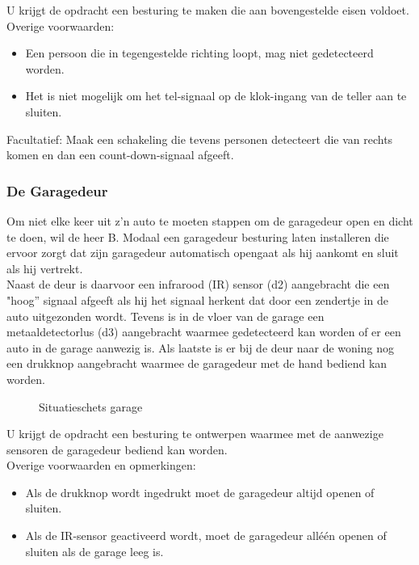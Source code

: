 U krijgt de opdracht een besturing te maken die aan bovengestelde eisen voldoet.\\
Overige voorwaarden:

\begin{itemize}
\item
Een persoon die in tegengestelde richting loopt, mag niet gedetecteerd worden.
\item
Het is niet mogelijk om het tel-signaal op de klok-ingang van de teller aan te sluiten.
\end{itemize}

Facultatief: Maak een schakeling die tevens personen detecteert die van rechts komen en dan een count-down-signaal afgeeft.

\clearpage
\subsubsection{De Garagedeur}

Om niet elke keer uit z'n auto te moeten stappen om de garagedeur open en dicht te doen, wil de heer B. Modaal een garagedeur besturing laten installeren die ervoor zorgt dat zijn garagedeur automatisch opengaat als hij aankomt en sluit als hij vertrekt.\\
Naast de deur is daarvoor een infrarood (IR) sensor (d2) aangebracht die een "hoog'' signaal afgeeft als hij het signaal herkent dat door een zendertje in de auto uitgezonden wordt. Tevens is in de vloer van de garage een metaaldetectorlus (d3) aangebracht waarmee gedetecteerd kan worden of er een auto in de garage aanwezig is. Als laatste is er bij de deur naar de woning nog een drukknop aangebracht waarmee de garagedeur met de hand bediend kan worden.\\


\begin{figure}[bth]
\centerline{}
\caption{Situatieschets garage}
\label{garage}
\end{figure}

U krijgt de opdracht een besturing te ontwerpen waarmee met de aanwezige sensoren de garagedeur bediend kan worden.\\
Overige voorwaarden en opmerkingen:

\begin{itemize}
\item
Als de drukknop wordt ingedrukt moet de garagedeur altijd openen of sluiten.
\item
Als de IR-sensor geactiveerd wordt, moet de garagedeur all\'e\'en openen of sluiten als de garage leeg is.
\end{itemize}

